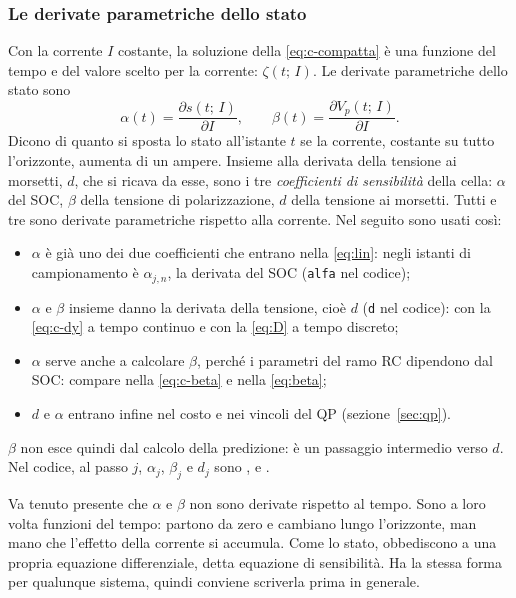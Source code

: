\documentclass[11pt,a4paper]{article}
\newcommand{\file}[1]{\texttt{\detokenize{#1}}}
\begin{document}
\subsubsection{Le derivate parametriche dello stato}

Con la corrente $I$ costante, la soluzione della \eqref{eq:c-compatta} è una
funzione del tempo e del valore scelto per la corrente: $\zeta(t;\, I)$. Le
derivate parametriche dello stato sono
\[
  \alpha(t) = \frac{\partial s(t;\, I)}{\partial I}, \qquad
  \beta(t)  = \frac{\partial V_p(t;\, I)}{\partial I} .
\]
Dicono di quanto si sposta lo stato all'istante $t$ se la corrente, costante su
tutto l'orizzonte, aumenta di un ampere. Insieme alla derivata della
tensione ai morsetti, $d$, che si ricava da esse, sono i tre
\emph{coefficienti di sensibilità} della cella: $\alpha$ del SOC, $\beta$
della tensione di polarizzazione, $d$ della tensione ai morsetti. Tutti e tre
sono derivate parametriche rispetto alla corrente. Nel seguito sono usati
così:
\begin{itemize}
  \item $\alpha$ è già uno dei due coefficienti che entrano nella
        \eqref{eq:lin}: negli istanti di campionamento è $\alpha_{j,n}$, la
        derivata del SOC (\texttt{alfa} nel codice);
  \item $\alpha$ e $\beta$ insieme danno la derivata della tensione, cioè $d$
        (\texttt{d} nel codice): con la \eqref{eq:c-dy} a tempo continuo e
        con la \eqref{eq:D} a tempo discreto;
  \item $\alpha$ serve anche a calcolare $\beta$, perché i parametri del ramo
        RC dipendono dal SOC: compare nella \eqref{eq:c-beta} e nella
        \eqref{eq:beta};
  \item $d$ e $\alpha$ entrano infine nel costo e nei vincoli del QP
        (sezione~\ref{sec:qp}).
\end{itemize}
$\beta$ non esce quindi dal calcolo della predizione: è un passaggio intermedio
verso $d$. Nel codice, al passo $j$, $\alpha_j$, $\beta_j$ e $d_j$ sono
\file{alfa_j}, \file{beta_j} e \file{d_j}.

Va tenuto presente che $\alpha$ e $\beta$ non sono derivate rispetto al tempo.
Sono a loro volta funzioni del tempo: partono da zero e cambiano lungo
l'orizzonte, man mano che l'effetto della corrente si accumula. Come lo stato,
obbediscono a una propria equazione differenziale, detta equazione di
sensibilità. Ha la stessa forma per qualunque sistema, quindi conviene
scriverla prima in generale.
\end{document}

